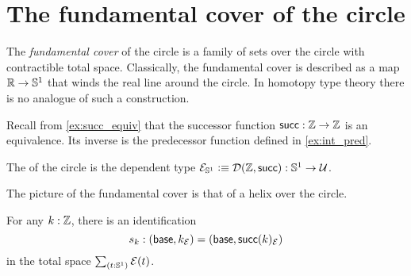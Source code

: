 \begin{comment}
\begin{defn}\label{defn:fiber_sequence}
A \define{fiber sequence} 
\begin{equation*}
F \hookrightarrow E \twoheadrightarrow B
\end{equation*}
consists of a \define{base type} $B$ with a base point $b_0$ and a dependent type $P:B\to\type$, a type $F$ called the \define{fiber} with an equivalence $\eqv{P(b_0)}{F}$, and a type $E$ called the \define{total space} with a map $p:E\to B$ and an equivalence $e:\eqv{(\sm{b:B}P(b))}{E}$ such that the triangle
\begin{equation*}
\begin{tikzcd}
\Big(\sm{b:B}P(b)\Big) \arrow[rr,"e"] \arrow[dr,swap,"\proj 1"] & & E \arrow[dl,"p"] \\
& B
\end{tikzcd}
\end{equation*}
commutes.
\end{defn}
\end{comment}

\section{The fundamental cover of the circle}

The \emph{fundamental cover} of the circle is a family of sets over the circle with contractible total space.
Classically, the fundamental cover is described as a map $\mathbb{R}\to\mathbb{S}^{1}$ that winds the real line around the circle.
In homotopy type theory there is no analogue of such a construction.

Recall from \cref{ex:succ_equiv} that the successor function $\mathsf{succ}:\mathbb{Z}\to \mathbb{Z}$ is an equivalence. Its inverse is the predecessor function defined in \cref{ex:int_pred}. 

\begin{defn}
The  of the circle is the dependent type $\mathcal{E}_{\mathbb{S}^{1}}\vcentcolon\equiv\mathcal{D}(\mathbb{Z},\mathsf{succ}):\mathbb{S}^{1}\to\mathcal{U}$.
\end{defn}

The picture of the fundamental cover is that of a helix over the circle.

\begin{lem}
For any $k:\mathbb{Z}$, there is an identification
\begin{equation*}
s_k:(\mathsf{base},k_{\mathcal{E}})=(\mathsf{base},\mathsf{succ}(k)_{\mathcal{E}})
\end{equation*}
in the total space $\sm{t:\sphere{1}}\mathcal{E}(t)$.
\end{lem}


